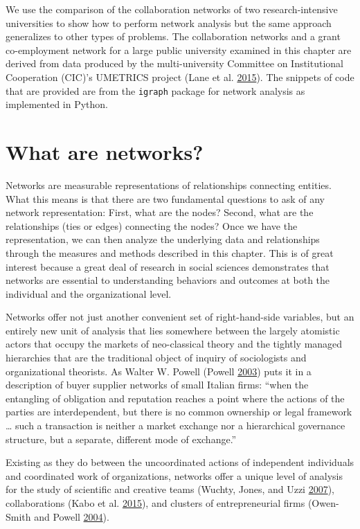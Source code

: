 \documentclass[]{krantz}
\begin{document}
We use the comparison of the collaboration networks of two
research-intensive universities to show how to perform network analysis
but the same approach generalizes to other types of problems. The
collaboration networks and a grant co-employment network for a large
public university examined in this chapter are derived from data
produced by the multi-university Committee on Institutional Cooperation
(CIC)'s UMETRICS project (Lane et al.
\protect\hyperlink{ref-lane2015new}{2015}). The snippets of code that
are provided are from the \texttt{igraph} package for network analysis
as implemented in Python.

\section{What are networks?}\label{what-are-networks}

Networks are measurable representations of relationships connecting
entities. What this means is that there are two fundamental questions to
ask of any network representation: First, what are the nodes? Second,
what are the relationships (ties or edges) connecting the nodes? Once we
have the representation, we can then analyze the underlying data and
relationships through the measures and methods described in this
chapter. This is of great interest because a great deal of research in
social sciences demonstrates that networks are essential to
understanding behaviors and outcomes at both the individual and the
organizational level.

Networks offer not just another convenient set of right-hand-side
variables, but an entirely new unit of analysis that lies somewhere
between the largely atomistic actors that occupy the markets of
neo-classical theory and the tightly managed hierarchies that are the
traditional object of inquiry of sociologists and organizational
theorists. As Walter W. Powell (Powell
\protect\hyperlink{ref-powell2003neither}{2003}) puts it in a
description of buyer supplier networks of small Italian firms: ``when
the entangling of obligation and reputation reaches a point where the
actions of the parties are interdependent, but there is no common
ownership or legal framework \ldots{} such a transaction is neither a
market exchange nor a hierarchical governance structure, but a separate,
different mode of exchange.''

Existing as they do between the uncoordinated actions of independent
individuals and coordinated work of organizations, networks offer a
unique level of analysis for the study of scientific and creative teams
(Wuchty, Jones, and Uzzi
\protect\hyperlink{ref-wuchty2007increasing}{2007}), collaborations
(Kabo et al. \protect\hyperlink{ref-kabo2015shared}{2015}), and clusters
of entrepreneurial firms (Owen-Smith and Powell
\protect\hyperlink{ref-owen2004knowledge}{2004}).
\end{document}
